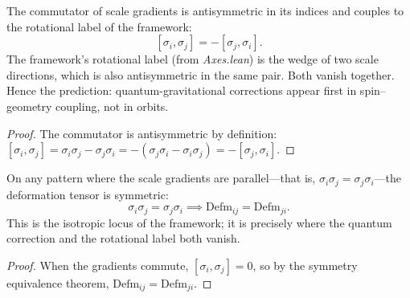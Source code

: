 \begin{theorem}
The commutator of scale gradients is antisymmetric in its indices and couples to the rotational label of the framework:
\[
[\sigma_i, \sigma_j] = -[\sigma_j, \sigma_i] .
\]
The framework's rotational label (from \textit{Axes.lean}) is the wedge of two scale directions, which is also antisymmetric in the same pair. Both vanish together. Hence the prediction: quantum-gravitational corrections appear first in spin–geometry coupling, not in orbits.
\begin{proof}
The commutator is antisymmetric by definition: $[\sigma_i, \sigma_j] = \sigma_i \sigma_j - \sigma_j \sigma_i = -(\sigma_j \sigma_i - \sigma_i \sigma_j) = -[\sigma_j, \sigma_i]$.
\end{proof}
\end{theorem}

\begin{theorem}
On any pattern where the scale gradients are parallel—that is, $\sigma_i \sigma_j = \sigma_j \sigma_i$—the deformation tensor is symmetric:
\[
\sigma_i \sigma_j = \sigma_j \sigma_i \implies \text{Defm}_{ij} = \text{Defm}_{ji} .
\]
This is the isotropic locus of the framework; it is precisely where the quantum correction and the rotational label both vanish.
\begin{proof}
When the gradients commute, $[\sigma_i, \sigma_j] = 0$, so by the symmetry equivalence theorem, $\text{Defm}_{ij} = \text{Defm}_{ji}$.
\end{proof}
\end{theorem}

